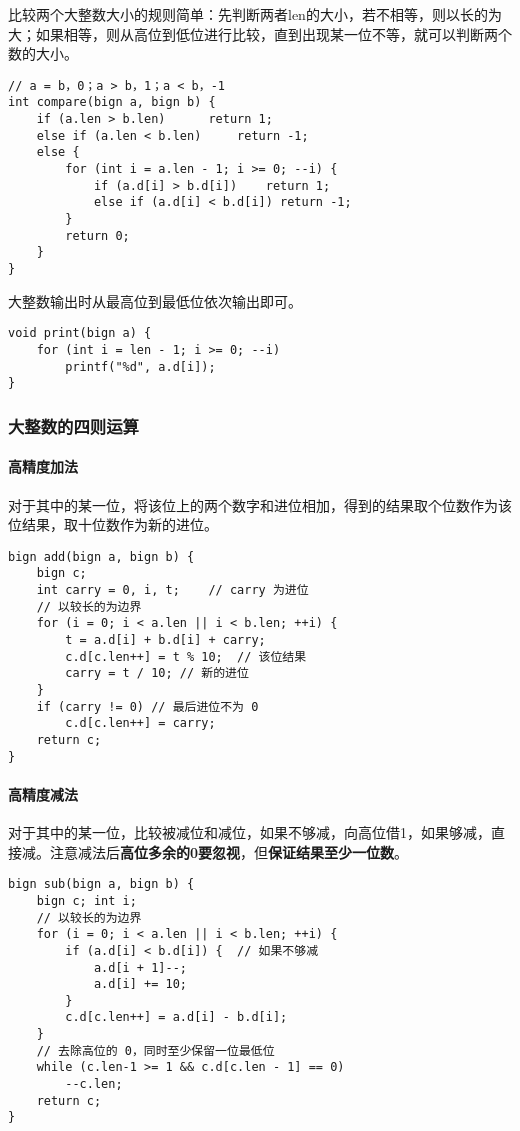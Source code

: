 比较两个大整数大小的规则简单：先判断两者len的大小，若不相等，则以长的为大；如果相等，则从高位到低位进行比较，直到出现某一位不等，就可以判断两个数的大小。

\begin{lstlisting}
// a = b，0；a > b，1；a < b，-1
int compare(bign a, bign b) {
	if (a.len > b.len)		return 1;
	else if (a.len < b.len)		return -1;
	else {
		for (int i = a.len - 1; i >= 0; --i) {
			if (a.d[i] > b.d[i])	return 1;
			else if (a.d[i] < b.d[i]) return -1;
		}
		return 0;
	}
}
\end{lstlisting}

大整数输出时从最高位到最低位依次输出即可。

\begin{lstlisting}
void print(bign a) {
	for (int i = len - 1; i >= 0; --i)
		printf("%d", a.d[i]);
}
\end{lstlisting}

\subsubsection{大整数的四则运算}
\label{bignumber}

\paragraph{高精度加法}

对于其中的某一位，将该位上的两个数字和进位相加，得到的结果取个位数作为该位结果，取十位数作为新的进位。

\begin{lstlisting}
bign add(bign a, bign b) {
	bign c;
	int carry = 0, i, t;	// carry 为进位
	// 以较长的为边界
	for (i = 0; i < a.len || i < b.len; ++i) {
		t = a.d[i] + b.d[i] + carry;
		c.d[c.len++] = t % 10;	// 该位结果
		carry = t / 10;	// 新的进位
	}
	if (carry != 0)	// 最后进位不为 0
		c.d[c.len++] = carry;
	return c;
}
\end{lstlisting}

\paragraph{高精度减法}

对于其中的某一位，比较被减位和减位，如果不够减，向高位借1，如果够减，直接减。注意减法后\textbf{高位多余的0要忽视}，但\textbf{保证结果至少一位数}。

\begin{lstlisting}
bign sub(bign a, bign b) {
	bign c; int i;
	// 以较长的为边界
	for (i = 0; i < a.len || i < b.len; ++i) {
		if (a.d[i] < b.d[i]) {	// 如果不够减
			a.d[i + 1]--;
			a.d[i] += 10;
		}
		c.d[c.len++] = a.d[i] - b.d[i];
	}
	// 去除高位的 0，同时至少保留一位最低位
	while (c.len-1 >= 1 && c.d[c.len - 1] == 0)
		--c.len;
	return c;
}
\end{lstlisting}

